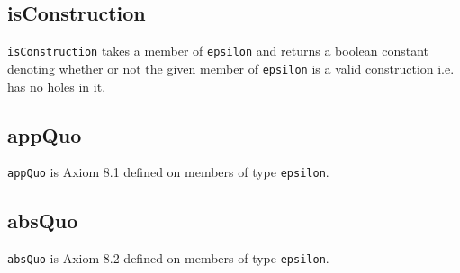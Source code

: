 \documentclass{article}
\def\c#1{\texttt{#1}}
\begin{document}
\subsection{isConstruction}
\c{isConstruction} takes a member of \c{epsilon} and returns a boolean constant denoting whether or not the given member of \c{epsilon} is a valid construction i.e. has no holes in it.

\subsection{appQuo}
\c{appQuo} is Axiom 8.1 defined on members of type \c{epsilon}. 

\subsection{absQuo}
\c{absQuo} is Axiom 8.2 defined on members of type \c{epsilon}.
\end{document}
